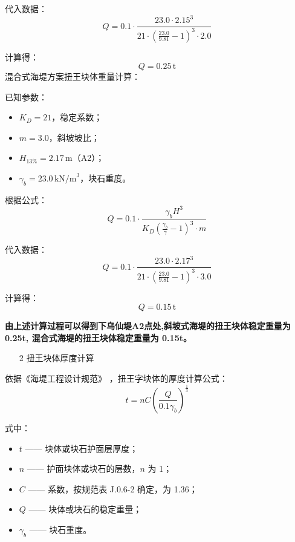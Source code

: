 \documentclass[UTF8, a4paper, 12pt]{ctexart} %
\begin{document}
代入数据：
\begin{equation}
    Q = 0.1 \cdot \frac{23.0 \cdot 2.15^3}{21 \cdot \left( \frac{23.0}{9.81} - 1 \right)^3 \cdot 2.0}
\end{equation}

计算得：
\begin{equation}
    Q = 0.25\,\text{t}
\end{equation}
混合式海堤方案扭王块体重量计算：

已知参数：

\begin{itemize}
    \item $K_D = 21$，稳定系数；
    \item $m = 3.0$，斜坡坡比；
    \item $H_{13\%} = 2.17\,\text{m}$（A2）；
    \item $\gamma_b = 23.0\,\text{kN/m}^3$，块石重度。
\end{itemize}


根据公式：
\begin{equation}
    Q = 0.1 \cdot \frac{\gamma_b H^3}{K_D \left( \frac{\gamma_b}{\gamma} - 1 \right)^3 \cdot m}
\end{equation}

代入数据：
\begin{equation}
    Q = 0.1 \cdot \frac{23.0 \cdot 2.17^3}{21 \cdot \left( \frac{23.0}{9.81} - 1 \right)^3 \cdot 3.0}
\end{equation}

计算得：
\begin{equation}
    Q = 0.15\,\text{t}
\end{equation}

\textbf{由上述计算过程可以得到下乌仙堤A2点处,斜坡式海堤的扭王块体稳定重量为
0.25t, 混合式海堤的扭王块体稳定重量为 0.15t。}


\begin{itemize}
    \item [2] 扭王块体厚度计算
\end{itemize}
\par
依据《海堤工程设计规范》 ，扭王字块体的厚度计算公式：
\begin{equation}
    t = nC \left( \frac{Q}{0.1 \gamma_b} \right)^{\frac{1}{3}}
\end{equation}

式中：
\begin{itemize}
    \item $t$ —— 块体或块石护面层厚度；
    \item $n$ —— 护面块体或块石的层数，$n$ 为 1；
    \item $C$ —— 系数，按规范表 J.0.6-2 确定，为 1.36；
    \item $Q$ —— 块体或块石的稳定重量；
    \item $\gamma_b$ —— 块石重度。
\end{itemize}
\end{document}
